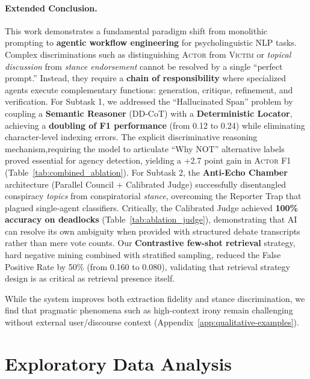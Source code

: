 \documentclass[11pt]{article}
\begin{document}
\paragraph{Extended Conclusion.}
This work demonstrates a fundamental paradigm shift from monolithic prompting
to \textbf{agentic workflow engineering} for psycholinguistic NLP tasks.
Complex discriminations such as distinguishing \textsc{Actor} from
\textsc{Victim} or \textit{topical discussion} from \textit{stance endorsement}
cannot be resolved by a single ``perfect prompt.'' Instead, they require a
\textbf{chain of responsibility} where specialized agents execute complementary
functions: generation, critique, refinement, and verification. For Subtask 1,
we addressed the ``Hallucinated Span'' problem by coupling a \textbf{Semantic
	Reasoner} (DD-CoT) with a \textbf{Deterministic Locator}, achieving a
\textbf{doubling of F1 performance} (from 0.12 to 0.24) while eliminating
character-level indexing errors. The explicit discriminative reasoning
mechanism,requiring the model to articulate ``Why NOT'' alternative labels
proved essential for agency detection, yielding a +2.7 point gain in \textsc{Actor} F1
(Table~\ref{tab:combined_ablation}). For Subtask 2, the \textbf{Anti-Echo Chamber}
architecture (Parallel Council + Calibrated Judge) successfully disentangled
conspiracy \textit{topics} from conspiratorial \textit{stance}, overcoming the
Reporter Trap that plagued single-agent classifiers. Critically, the Calibrated
Judge achieved \textbf{100\% accuracy on deadlocks}
(Table~\ref{tab:ablation_judge}), demonstrating that AI can resolve its own
ambiguity when provided with structured debate transcripts rather than mere
vote counts. Our \textbf{Contrastive few-shot retrieval} strategy, hard
negative mining combined with stratified sampling, reduced the False Positive
Rate by 50\% (from 0.160 to 0.080), validating that retrieval strategy design
is as critical as retrieval presence itself.

While the system improves both extraction fidelity and stance discrimination,
we find that pragmatic phenomena such as high-context irony remain challenging
without external user/discourse context (Appendix~\ref{app:qualitative-examples}).

\section{Exploratory Data Analysis}
\label{sec:eda}
\end{document}
